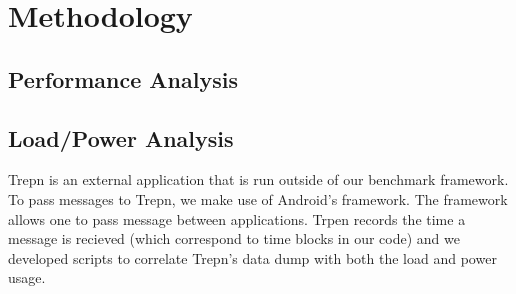 \section{Methodology}


\subsection{Performance Analysis}


\subsection{Load/Power Analysis}

Trepn is an external application that is run outside of our benchmark framework.
To pass messages to Trepn, we make use of Android's  framework.
The  framework allows one to pass message between applications.
Trpen records the time a message is recieved (which correspond to time blocks
in our code) and we developed scripts to correlate Trepn's data dump with both
the load and power usage.
